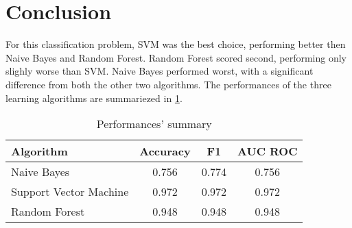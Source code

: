 \section{Conclusion}
\label{sec:conclusion}

For this classification problem, \ac{SVM} was the best choice, performing better then Naive Bayes and Random Forest.
Random Forest scored second, performing only slighly worse than \ac{SVM}.
Naive Bayes performed worst, with a significant difference from both the other two algorithms.
The performances of the three learning algorithms are summariezed in \cref{tab:summary}.

\begin{table}
	\centering
	\caption{Performances' summary}
	\label{tab:summary}
	\begin{tabular}{lccc}
		\toprule
			\multicolumn{1}{l}{Algorithm} &
			\multicolumn{1}{c}{Accuracy} &
			\multicolumn{1}{c}{F1} &
			\multicolumn{1}{c}{AUC ROC} \\
		\midrule
			Naive Bayes            & 0.756 & 0.774 & 0.756 \\
			Support Vector Machine & 0.972 & 0.972 & 0.972 \\
			Random Forest          & 0.948 & 0.948 & 0.948 \\
		\bottomrule
	\end{tabular}
\end{table}
